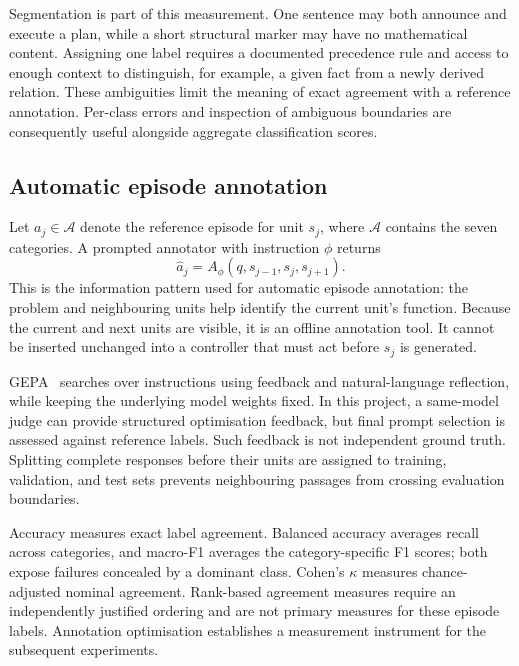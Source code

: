 \documentclass[12pt,a4paper,twoside,openright]{book}
\begin{document}
Segmentation is part of this measurement. One sentence may both announce and
execute a plan, while a short structural marker may have no mathematical
content. Assigning one label requires a documented precedence rule and access
to enough context to distinguish, for example, a given fact from a newly
derived relation. These ambiguities limit the meaning of exact agreement
with a reference annotation. Per-class errors and inspection of ambiguous
boundaries are consequently useful alongside aggregate classification scores.

\subsection{Automatic episode annotation}

Let $a_j\in\mathcal{A}$ denote the reference episode for unit $s_j$, where
$\mathcal{A}$ contains the seven categories. A prompted annotator with
instruction $\phi$ returns
\begin{equation}
  \widehat a_j = A_\phi(q,s_{j-1},s_j,s_{j+1}).
  \label{eq:offline-annotator}
\end{equation}
This is the information pattern used for automatic episode annotation: the problem
and neighbouring units help identify the current unit's function. Because
the current and next units are visible, it is an offline annotation tool.
It cannot be inserted unchanged into a controller that must act before
$s_j$ is generated.

GEPA~\cite{agrawal2026gepa} searches over instructions using feedback and
natural-language reflection, while keeping the underlying model weights fixed.
In this project, a same-model judge can provide
structured optimisation feedback, but final prompt selection is assessed
against reference labels. Such feedback is not independent ground truth.
Splitting complete responses before their units are assigned to training,
validation, and test sets prevents neighbouring passages from crossing
evaluation boundaries.

Accuracy measures exact label agreement. Balanced accuracy averages recall
across categories, and macro-F1 averages the category-specific F1 scores; both
expose failures concealed by a dominant class. Cohen's $\kappa$ measures
chance-adjusted nominal agreement. Rank-based agreement measures require an
independently justified ordering and are not primary measures for these
episode labels. Annotation optimisation establishes a measurement instrument
for the subsequent experiments.
\end{document}
